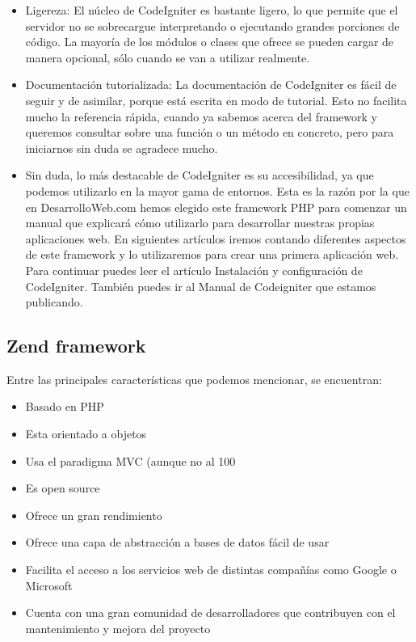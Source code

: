 \begin{itemize}
\item Ligereza: El núcleo de CodeIgniter es bastante ligero, lo que permite que el servidor no se sobrecargue interpretando o ejecutando grandes porciones de código. La mayoría de los módulos o clases que ofrece se pueden cargar de manera opcional, sólo cuando se van a utilizar realmente.

\item Documentación tutorializada: La documentación de CodeIgniter es fácil de seguir y de asimilar, porque está escrita en modo de tutorial. Esto no facilita mucho la referencia rápida, cuando ya sabemos acerca del framework y queremos consultar sobre una función o un método en concreto, pero para iniciarnos sin duda se agradece mucho.

\item Sin duda, lo más destacable de CodeIgniter es su accesibilidad, ya que podemos utilizarlo en la mayor gama de entornos. Esta es la razón por la que en DesarrolloWeb.com hemos elegido este framework PHP para comenzar un manual que explicará cómo utilizarlo para desarrollar nuestras propias aplicaciones web. En siguientes artículos iremos contando diferentes aspectos de este framework y lo utilizaremos para crear una primera aplicación web. Para continuar puedes leer el artículo Instalación y configuración de CodeIgniter. También puedes ir al Manual de Codeigniter que estamos publicando.

\end{itemize}

\subsection{Zend framework}

Entre las principales características que podemos mencionar, se encuentran:

\begin{itemize}

\item Basado en PHP
\item Esta orientado a objetos
\item Usa el paradigma MVC (aunque no al 100%
\item Es open source
\item Ofrece un gran rendimiento
\item Ofrece una capa de abstracción a bases de datos fácil de usar
\item Facilita el acceso a los servicios web de distintas compañías como Google o Microsoft
\item Cuenta con una gran comunidad de desarrolladores que contribuyen con el mantenimiento y mejora del proyecto

\end{itemize}

